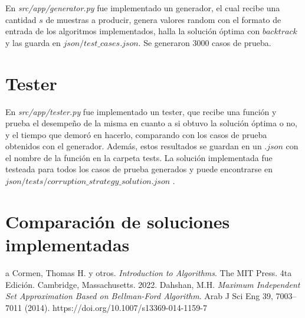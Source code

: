\documentclass[10pt]{article} %
\begin{document}
	En \textit{src/app/generator.py} fue implementado un generador, el cual recibe una cantidad $ s $ de muestras a producir, genera valores random con el formato de entrada de los algoritmos implementados, halla la soluci\'on \'optima con $ backtrack $ y las guarda en $ json/test\_cases.json $. Se generaron 3000 casos de prueba.
	
	\section{Tester}
	En \textit{src/app/tester.py} fue implementado un tester, que recibe una funci\'on y prueba el desempe\~no de la misma en cuanto a si obtuvo la soluci\'on \'optima o no, y el tiempo que demor\'o en hacerlo, comparando con los casos de prueba obtenidos con el generador. Adem\'as, estos resultados se guardan en un $ .json $ con el nombre de la funci\'on en la carpeta tests. La soluci\'on implementada fue testeada para todos los casos de prueba generados y puede encontrarse en $ json/tests/corruption\_strategy\_solution.json $ .
	
	\section{Comparaci\'on de soluciones implementadas}          

%    
%    
%    
%	
	
	\begin{thebibliography}
		a
		 Cormen, Thomas H. y otros. \emph{Introduction to Algorithms}. 
		The MIT Press.
		4ta Edici\'on.		
		Cambridge, Massachusetts.
		2022.
		 Dahshan, M.H. \emph{Maximum Independent Set Approximation Based on Bellman-Ford Algorithm}. Arab J Sci Eng 39, 7003–7011 (2014). https://doi.org/10.1007/s13369-014-1159-7
	\end{thebibliography}
\end{document}
